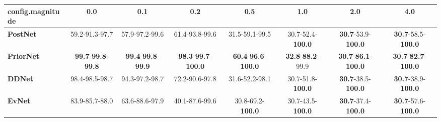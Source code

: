 \begin{tabular}{lccccccc}
\toprule
\textbf{config.magnitude} &                                        0.0 &                                        0.1 &                                         0.2 &                                         0.5 &                               1.0 &                                         2.0 &                                         4.0 \\
\midrule
\textbf{PostNet } &                             59.2-91.3-97.7 &                             57.9-97.2-99.6 &                              61.4-93.8-99.6 &                              31.5-59.1-99.5 &          30.7-52.4-\textbf{100.0} &           \textbf{30.7}-53.9-\textbf{100.0} &           \textbf{30.7}-58.5-\textbf{100.0} \\
\textbf{PriorNet} &  \textbf{99.7}-\textbf{99.8}-\textbf{99.8} &  \textbf{99.4}-\textbf{99.8}-\textbf{99.9} &  \textbf{98.3}-\textbf{99.7}-\textbf{100.0} &  \textbf{60.4}-\textbf{96.6}-\textbf{100.0} &  \textbf{32.8}-\textbf{88.2}-99.9 &  \textbf{30.7}-\textbf{86.1}-\textbf{100.0} &  \textbf{30.7}-\textbf{82.7}-\textbf{100.0} \\
\textbf{DDNet   } &                             98.4-98.5-98.7 &                             94.3-97.2-98.7 &                              72.2-90.6-97.8 &                              31.6-52.2-98.1 &          30.7-51.8-\textbf{100.0} &           \textbf{30.7}-38.5-\textbf{100.0} &           \textbf{30.7}-38.9-\textbf{100.0} \\
\textbf{EvNet   } &                             83.9-85.7-88.0 &                             63.6-88.6-97.9 &                              40.1-87.6-99.6 &                    30.8-69.2-\textbf{100.0} &          30.7-43.5-\textbf{100.0} &           \textbf{30.7}-37.4-\textbf{100.0} &           \textbf{30.7}-57.6-\textbf{100.0} \\
\bottomrule
\end{tabular}
